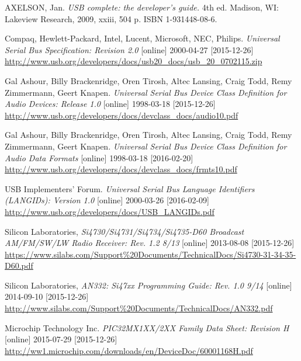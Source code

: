 \documentclass[czech,master,public,dept460,male,cpdeclaration]{diploma}	%
\begin{document}
\MakeTitlePages














\begin{thebibliography}{99}


 AXELSON, Jan. 
\textit{USB complete: the developer's guide.} 4th ed. Madison, WI: Lakeview Research, 2009, xxiii, 504 p. ISBN 1-931448-08-6.

 Compaq, Hewlett-Packard, Intel, Lucent, Microsoft, NEC, Philips. 
\textit{Universal Serial Bus Specification: Revision 2.0} [online] 2000-04-27 [2015-12-26]
\url{http://www.usb.org/developers/docs/usb20_docs/usb_20_0702115.zip}

 Gal Ashour, Billy Brackenridge, Oren Tirosh, Altec Lansing, Craig Todd, Remy Zimmermann, Geert Knapen. 
\textit{Universal Serial Bus Device Class Definition for Audio Devices: Release 1.0} [online] 1998-03-18 [2015-12-26]
\url{http://www.usb.org/developers/docs/devclass_docs/audio10.pdf}

 Gal Ashour, Billy Brackenridge, Oren Tirosh, Altec Lansing, Craig Todd, Remy Zimmermann, Geert Knapen. 
\textit{Universal Serial Bus Device Class Definition for Audio Data Formats} [online] 1998-03-18 [2016-02-20]
\url{http://www.usb.org/developers/docs/devclass_docs/frmts10.pdf}

  USB Implementers’ Forum. 
\textit{Universal Serial Bus Language Identifiers (LANGIDs): Version 1.0} [online] 2000-03-26 [2016-02-09]
\url{http://www.usb.org/developers/docs/USB_LANGIDs.pdf}

 Silicon Laboratories,
\textit{Si4730/Si4731/Si4734/Si4735-D60 Broadcast AM/FM/SW/LW Radio Receiver: Rev. 1.2 8/13} [online] 2013-08-08 [2015-12-26] \url{https://www.silabs.com/Support\%20Documents/TechnicalDocs/Si4730-31-34-35-D60.pdf}

 Silicon Laboratories,
\textit{AN332: Si47xx Programming Guide: Rev. 1.0 9/14 } [online] 2014-09-10 [2015-12-26] \url{http://www.silabs.com/Support\%20Documents/TechnicalDocs/AN332.pdf}

 Microchip Technology Inc.
\textit{PIC32MX1XX/2XX Family Data Sheet: Revision H} [online] 2015-07-29 [2015-12-26]
\url{http://ww1.microchip.com/downloads/en/DeviceDoc/60001168H.pdf}


\end{thebibliography}
\end{document}

